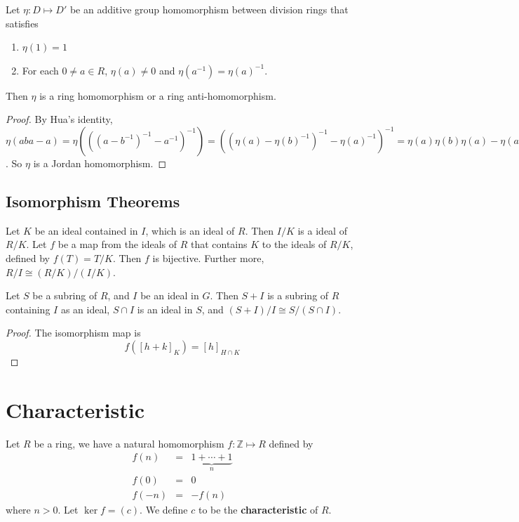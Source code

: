 \documentclass[12pt]{book}
\begin{document}
\begin{theorem}[Hua]
	Let $\eta: D\mapsto D'$ be an additive group homomorphism between division rings that satisfies
	\begin{enumerate}
		\item $\eta(1)=1$
		\item For each $0\neq a\in R$, $\eta(a)\neq 0$ and $\eta(a^{-1})=\eta(a)^{-1}$.
	\end{enumerate}
	Then $\eta$ is a ring homomorphism or a ring anti-homomorphism.
\end{theorem}
\begin{proof}
	By Hua's identity, $\eta(aba-a)=\eta(((a-b^{-1})^{-1}-a^{-1})^{-1})=((\eta(a)-\eta(b)^{-1})^{-1}-\eta(a)^{-1})^{-1}=\eta(a)\eta(b)\eta(a)-\eta(a)$. So $\eta$ is a Jordan homomorphism.
\end{proof}
	
\subsection{Isomorphism Theorems}
\begin{theorem}
	Let $K$ be an ideal contained in $I$, which is an ideal of $R$. Then $I/K$ is a ideal of $R/K$. Let $f$ be a map from the ideals of $R$ that contains $K$ to the ideals of $R/K$, defined by $f(T)=T/K$. Then $f$ is bijective. Further more, $R/I\cong (R/K)/(I/K)$.
\end{theorem}
	
\begin{theorem}
	Let $S$ be a subring of $R$, and $I$ be an ideal in $G$. Then $S+I$ is a subring of $R$ containing $I$ as an ideal, $S\cap I$ is an ideal in $S$, and $(S+I)/I\cong S/(S\cap I)$.
\end{theorem}
\begin{proof}
	The isomorphism map is 
	\begin{equation}
		f([h+k]_K)=[h]_{H\cap K}
	\end{equation}
\end{proof}

\section{Characteristic}

\begin{definition}
	Let $R$ be a ring, we have a natural homomorphism $f:\mathbb Z\mapsto R$ defined by 
	\begin{eqnarray}
		f(n)&=&\underbrace{1+\cdots+1}_n\\
		f(0)&=&0\\
		f(-n)&=&-f(n)
	\end{eqnarray}
	where $n>0$. Let $\ker f=(c)$. We define $c$ to be the {\bf characteristic} of $R$.
\end{definition}
\end{document}
